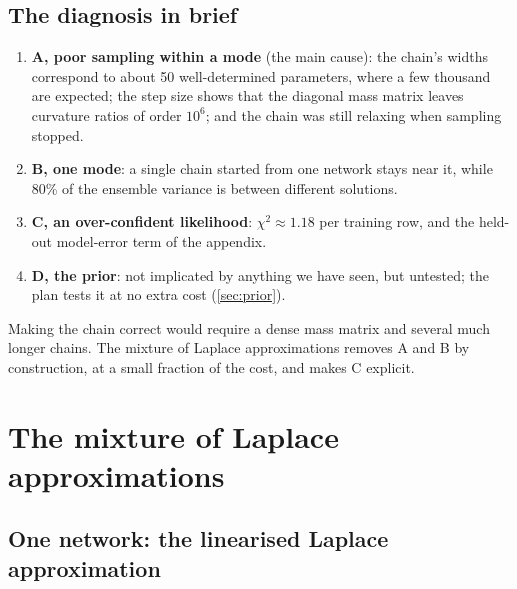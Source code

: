 \subsection{The diagnosis in brief}

\begin{keyidea}
\begin{enumerate}
  \item \textbf{A, poor sampling within a mode} (the main cause): the chain's widths
    correspond to about 50 well-determined parameters, where a few thousand are expected;
    the step size shows that the diagonal mass matrix leaves curvature ratios of order
    $10^6$; and the chain was still relaxing when sampling stopped.
  \item \textbf{B, one mode}: a single chain started from one network stays near it, while
    80\% of the ensemble variance is between different solutions.
  \item \textbf{C, an over-confident likelihood}: $\chi^2 \approx 1.18$ per training row,
    and the held-out model-error term of the appendix.
  \item \textbf{D, the prior}: not implicated by anything we have seen, but untested; the
    plan tests it at no extra cost (\cref{sec:prior}).
\end{enumerate}
Making the chain correct would require a dense mass matrix and several much longer chains.
The mixture of Laplace approximations removes A and B by construction, at a small fraction
of the cost, and makes C explicit.
\end{keyidea}

\section{The mixture of Laplace approximations}
\label{sec:mola}

\subsection{One network: the linearised Laplace approximation}

